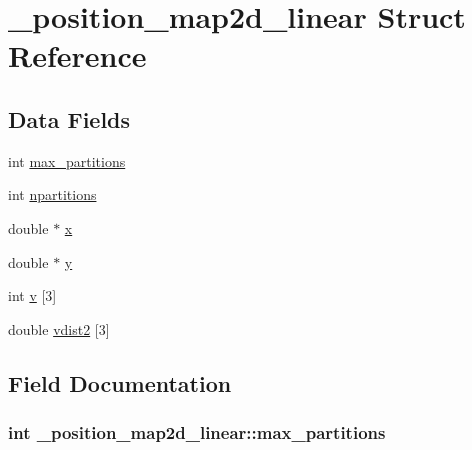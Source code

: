 \hypertarget{struct__position__map2d__linear}{}\section{\+\_\+position\+\_\+map2d\+\_\+linear Struct Reference}
\label{struct__position__map2d__linear}
\subsection*{Data Fields}
\begin{DoxyCompactItemize}
\item 
int \hyperlink{struct__position__map2d__linear_a482e540503ada635bd24f61d42809d9e}{max\+\_\+partitions}
\item 
int \hyperlink{struct__position__map2d__linear_af4bb06ccb30d1e60c30cc2948a70e329}{npartitions}
\item 
double $\ast$ \hyperlink{struct__position__map2d__linear_a076d1309c846cee9d291fbb58044970e}{x}
\item 
double $\ast$ \hyperlink{struct__position__map2d__linear_ad43100111e5cb77a711ce9e73ef8dc95}{y}
\item 
int \hyperlink{struct__position__map2d__linear_a96b27ad1b7340512cc10442d85efd945}{v} \mbox{[}3\mbox{]}
\item 
double \hyperlink{struct__position__map2d__linear_a6c26a8cac0ea2225c11ee477bea37e22}{vdist2} \mbox{[}3\mbox{]}
\end{DoxyCompactItemize}


\subsection{Field Documentation}
\subsubsection[{\texorpdfstring{max\+\_\+partitions}{max_partitions}}]{\setlength{\rightskip}{0pt plus 5cm}int \+\_\+position\+\_\+map2d\+\_\+linear\+::max\+\_\+partitions}\hypertarget{struct__position__map2d__linear_a482e540503ada635bd24f61d42809d9e}{}\label{struct__position__map2d__linear_a482e540503ada635bd24f61d42809d9e}


